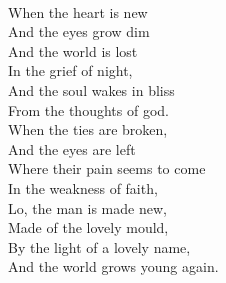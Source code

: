 \documentclass[smalldemyvopaper,11pt,twoside,onecolumn,openright,extrafontsizes]{memoir}
\begin{document}
\\When the heart is new
\\And the eyes grow dim
\\And the world is lost
\\In the grief of night,
\\And the soul wakes in bliss
\\From the thoughts of god.
\\When the ties are broken,
\\And the eyes are left
\\Where their pain seems to come
\\In the weakness of faith,
\\Lo, the man is made new,
\\Made of the lovely mould,
\\By the light of a lovely name,
\\And the world grows young again.
\end{document}
